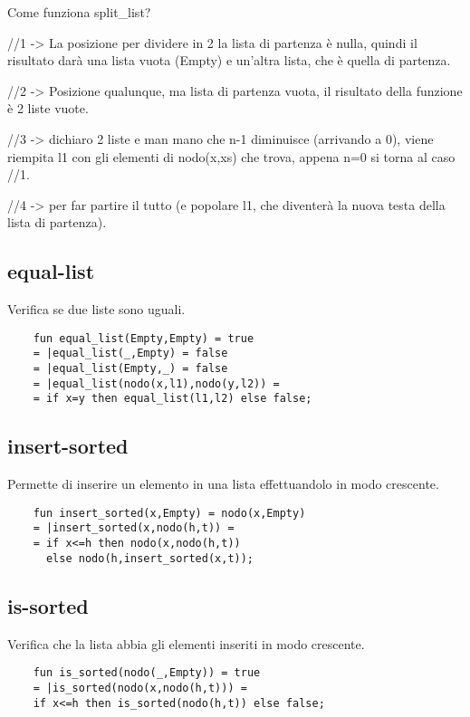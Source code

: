 Come funziona split\_list?

//1 -> La posizione per dividere in 2 la lista di partenza è nulla, quindi il risultato darà una lista vuota (Empty) e un'altra lista, che è quella di partenza.


//2 -> Posizione qualunque, ma lista di partenza vuota, il risultato della funzione è 2 liste vuote.


//3 -> dichiaro 2 liste e man mano che n-1 diminuisce (arrivando a 0), viene riempita l1 con gli elementi di nodo(x,xs) che trova, appena n=0 si torna al caso //1.


//4 -> per far partire il tutto (e popolare l1, che diventerà la nuova testa della lista di partenza).


\subsection{equal-list}

Verifica se due liste sono uguali.

\begin{lstlisting}
    fun equal_list(Empty,Empty) = true
    = |equal_list(_,Empty) = false
    = |equal_list(Empty,_) = false
    = |equal_list(nodo(x,l1),nodo(y,l2)) =
    = if x=y then equal_list(l1,l2) else false;
\end{lstlisting}    

\subsection{insert-sorted}

Permette di inserire un elemento in una lista effettuandolo in modo crescente.

\begin{lstlisting}
    fun insert_sorted(x,Empty) = nodo(x,Empty)
    = |insert_sorted(x,nodo(h,t)) =
    = if x<=h then nodo(x,nodo(h,t)) 
      else nodo(h,insert_sorted(x,t));
\end{lstlisting}

\subsection{is-sorted}

Verifica che la lista abbia gli elementi inseriti in modo crescente.

\begin{lstlisting}
    fun is_sorted(nodo(_,Empty)) = true
    = |is_sorted(nodo(x,nodo(h,t))) = 
    if x<=h then is_sorted(nodo(h,t)) else false;
\end{lstlisting}

